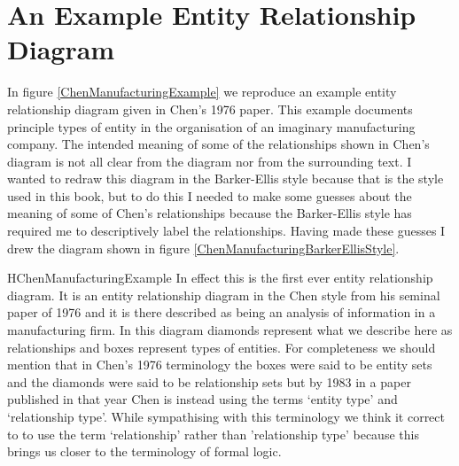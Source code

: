 \section{An Example Entity Relationship Diagram}
\label{AnExampleEntityRelationshipDiagram}
In figure \ref{ChenManufacturingExample} we reproduce an example entity relationship diagram  given in Chen's 1976 paper. This example documents principle types of entity in the organisation of an imaginary manufacturing company. The intended meaning of some of the relationships shown in Chen's diagram is not all clear from the diagram nor from the surrounding text. I wanted to redraw
this diagram in the Barker-Ellis style because that is the style used in this book, but to do this I needed to make some guesses about the meaning of some of Chen's relationships because the Barker-Ellis style has required me to descriptively label the relationships. Having made these guesses I drew the diagram shown
 in figure \ref{ChenManufacturingBarkerEllisStyle}. 

\begin{erboxedFigure} {H}{ChenManufacturingExample}{
In effect this is the first ever entity relationship diagram. It is an entity relationship diagram in the Chen style from his seminal paper of 1976 and it is there described as being an analysis of information in a manufacturing firm. In this diagram
diamonds represent what we describe here as relationships and boxes represent types of entities.  
For completeness we should mention that in Chen's 1976 terminology the boxes were said to be entity sets and the diamonds were said to be relationship sets but by 1983 in a paper published in that year Chen is instead using the terms `entity type' and `relationship type'. While sympathising with this terminology we think it correct to to use the term `relationship' rather than 'relationship type' because this brings us closer to the terminology of formal logic.
}
\begin{center}
\scalebox{0.80}{}
\end{center}
\end{erboxedFigure}

